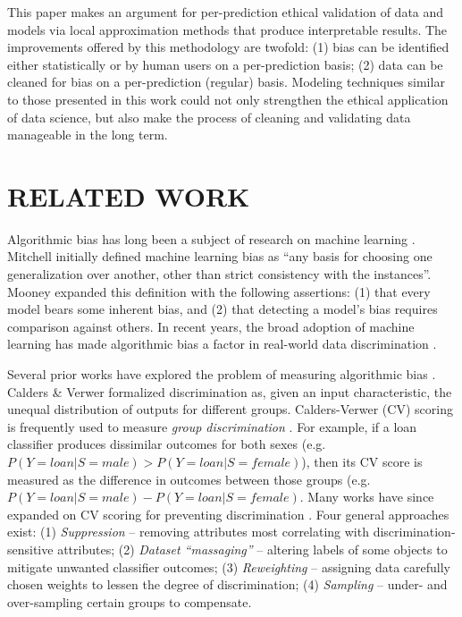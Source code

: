 \documentclass[conference]{IEEEtran}
\begin{document}
This paper makes an argument for per-prediction ethical validation of data and models via local approximation methods that produce interpretable results. The improvements offered by this methodology are twofold: (1) bias can be identified either statistically or by human users on a per-prediction basis; (2) data can be cleaned for bias on a per-prediction (regular) basis. Modeling techniques similar to those presented in this work could not only strengthen the ethical application of data science, but also make the process of cleaning and validating data manageable in the long term.


\section{RELATED WORK}
\label{sec:related}
Algorithmic bias has long been a subject of research on machine learning \cite{kirkpatrick2016battling, hajian2016algorithmic, baeza2016data}. 
Mitchell \cite{mitchell1980need} initially defined machine learning bias as ``any basis for choosing one generalization over another, other than strict consistency with the instances''.
Mooney \cite{mooney1996comparative} expanded this definition with the following assertions: (1) that every model bears some inherent bias, and (2) that detecting a model's bias requires comparison against others.
In recent years, the broad adoption of machine learning has made algorithmic bias a factor in real-world data discrimination \cite{squires2003racial, stoll2004black, angwinmachine}.

Several prior works have explored the problem of measuring algorithmic bias \cite{romei2014multidisciplinary, kamiran2013quantifying, zliobaite2015survey}.
Calders \& Verwer \cite{Calders2010} formalized discrimination as, given an input characteristic, the unequal distribution of outputs for different groups. 
Calders-Verwer (CV) scoring is frequently \cite{kamishima2011fairness, kamishima2012fairness, galhotra2017fairness, kamiran2012decision, vzliobaite2011handling} used to measure \emph{group discrimination} \cite{zafar2015learning, zemel2013learning}. For example, if a loan classifier produces dissimilar outcomes for both sexes (e.g. $P(Y=loan|S=male) > P(Y=loan|S=female)$), then its CV score is measured as the difference in outcomes between those groups (e.g. $P(Y=loan|S=male) - P(Y=loan|S=female)$.
Many works have since expanded on CV scoring for preventing discrimination \cite{zafar2017fairness, kamiran2013techniques, galhotra2017fairness}. 
Four general approaches exist: (1) \emph{Suppression} -- removing attributes most correlating with discrimination-sensitive attributes; (2) \emph{Dataset ``massaging''} -- altering labels of some objects to mitigate unwanted classifier outcomes; (3) \emph{Reweighting} -- assigning data carefully chosen weights to lessen the degree of discrimination; (4) \emph{Sampling} -- under- and over-sampling certain groups to compensate.
\end{document}
